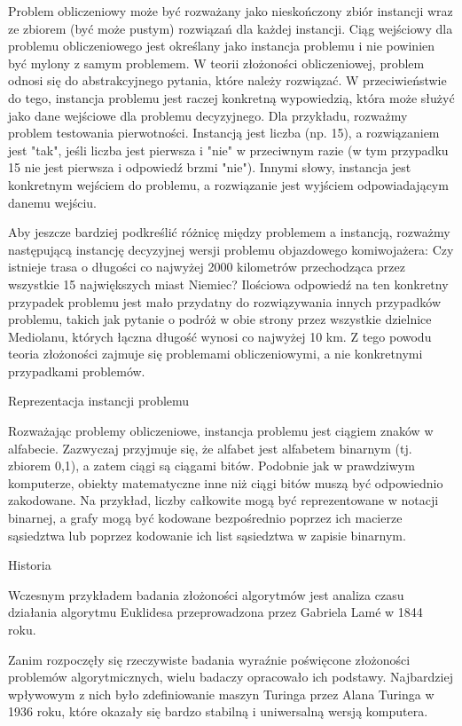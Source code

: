 Problem obliczeniowy może być rozważany jako nieskończony zbiór instancji wraz ze zbiorem (być może pustym) rozwiązań dla każdej instancji. Ciąg wejściowy dla problemu obliczeniowego jest określany jako instancja problemu i nie powinien być mylony z samym problemem. W teorii złożoności obliczeniowej, problem odnosi się do abstrakcyjnego pytania, które należy rozwiązać. W przeciwieństwie do tego, instancja problemu jest raczej konkretną wypowiedzią, która może służyć jako dane wejściowe dla problemu decyzyjnego. Dla przykładu, rozważmy problem testowania pierwotności. Instancją jest liczba (np. 15), a rozwiązaniem jest "tak", jeśli liczba jest pierwsza i "nie" w przeciwnym razie (w tym przypadku 15 nie jest pierwsza i odpowiedź brzmi "nie"). Innymi słowy, instancja jest konkretnym wejściem do problemu, a rozwiązanie jest wyjściem odpowiadającym danemu wejściu.

Aby jeszcze bardziej podkreślić różnicę między problemem a instancją, rozważmy następującą instancję decyzyjnej wersji problemu objazdowego komiwojażera: Czy istnieje trasa o długości co najwyżej 2000 kilometrów przechodząca przez wszystkie 15 największych miast Niemiec? Ilościowa odpowiedź na ten konkretny przypadek problemu jest mało przydatny do rozwiązywania innych przypadków problemu, takich jak pytanie o podróż w obie strony przez wszystkie dzielnice Mediolanu, których łączna długość wynosi co najwyżej 10 km. Z tego powodu teoria złożoności zajmuje się problemami obliczeniowymi, a nie konkretnymi przypadkami problemów.

Reprezentacja instancji problemu

Rozważając problemy obliczeniowe, instancja problemu jest ciągiem znaków w alfabecie. Zazwyczaj przyjmuje się, że alfabet jest alfabetem binarnym (tj. zbiorem {0,1}), a zatem ciągi są ciągami bitów. Podobnie jak w prawdziwym komputerze, obiekty matematyczne inne niż ciągi bitów muszą być odpowiednio zakodowane. Na przykład, liczby całkowite mogą być reprezentowane w notacji binarnej, a grafy mogą być kodowane bezpośrednio poprzez ich macierze sąsiedztwa lub poprzez kodowanie ich list sąsiedztwa w zapisie binarnym.

Historia

Wczesnym przykładem badania złożoności algorytmów jest analiza czasu działania algorytmu Euklidesa przeprowadzona przez Gabriela Lamé w 1844 roku.

Zanim rozpoczęły się rzeczywiste badania wyraźnie poświęcone złożoności problemów algorytmicznych, wielu badaczy opracowało ich podstawy. Najbardziej wpływowym z nich było zdefiniowanie maszyn Turinga przez Alana Turinga w 1936 roku, które okazały się bardzo stabilną i uniwersalną wersją komputera.

